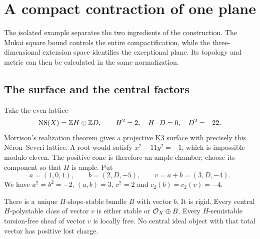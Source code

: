 \section{A compact contraction of one plane}\label{sec:isolated-plane}

The isolated example separates the two ingredients of the construction.
The Mukai square bound controls the entire compactification, while the
three-dimensional extension space identifies the exceptional plane.
Its topology and metric can then be calculated in the same normalization.

\subsection{The surface and the central factors}
Take the even lattice
\[
 \operatorname{NS}(X)=\mathbb Z H\oplus\mathbb Z D,\qquad H^2=2,\quad H\cdot D=0,
 \quad D^2=-22.
\]
Morrison's realization theorem \cite[Corollary~2.9(i)]{morrison}
gives a projective K3 surface with precisely this N\'eron--Severi
lattice. A root would satisfy $x^2-11y^2=-1$, which is impossible
modulo eleven. The positive cone is therefore an ample chamber;
choose its component so that $H$ is ample. Put
\begin{equation}\label{eq:isolated-vectors}
 a=(1,0,1),\qquad b=(2,D,-5),\qquad v=a+b=(3,D,-4).
\end{equation}
We have $a^2=b^2=-2$, $(a,b)=3$, $v^2=2$ and
$c_2(b)=c_2(v)=-4$.

\begin{lemma}\label{lem:isolated-factors}
There is a unique $H$-slope-stable bundle $B$ with vector $b$.
It is rigid. Every central $H$-polystable class of vector $v$
is either stable or $\mathcal O_X\oplus B$. Every $H$-semistable
torsion-free sheaf of vector $v$ is locally free. No central ideal
object with that total vector has positive lost charge.
\end{lemma}

